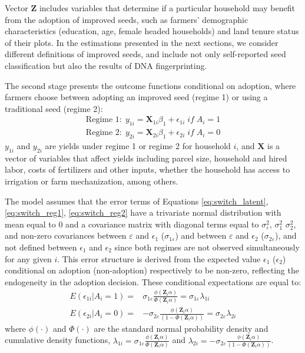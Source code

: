 \documentclass[11pt]{article}
\begin{document}
Vector $\bm{Z}$ includes variables that determine if a particular household may benefit from the adoption of improved seeds, such as farmers' demographic characteristics (education, age, female headed households) and land tenure status of their plots. In the estimations presented in the next sections, we consider different definitions of improved seeds, and include not only self-reported seed classification but also the results of DNA fingerprinting.  \par
The second stage presents the outcome functions conditional on adoption, where farmers choose between adopting an improved seed (regime 1) or using a traditional seed (regime 2):
\begin{align}
    \text{Regime 1}: \; y_{1i}=\bm{X}_{1i}\beta_1+ \epsilon_{1i} \; if \; A_i=1 \label{eq:switch_reg1}\\
     \text{Regime 2}: \; y_{2i}=\bm{X}_{2i}\beta_1+ \epsilon_{2i} \; if \; A_i=0 \label{eq:switch_reg2} 
\end{align}
$y_{1i}$ and $y_{2i}$ are yields under regime 1 or regime 2 for household $i$, and $\bm{X}$ is a vector of variables that affect yields including parcel size, household and hired labor, costs of fertilizers and other inputs, whether the household has access to irrigation or farm mechanization, among others.  \par
The model assumes that the error terms of Equations \ref{eq:switch_latent}, \ref{eq:switch_reg1}, \ref{eq:switch_reg2} have a trivariate normal distribution with mean equal to 0 and a covariance matrix with diagonal terms equal to $\sigma_{\varepsilon}^2$, $\sigma_1^2$ $\sigma_2^2$, and non-zero covariances between $\varepsilon$ and $\epsilon_1$ ($\sigma_{1\varepsilon}$) and between $\varepsilon$ and $\epsilon_2$ ($\sigma_{2\varepsilon}$), and not defined between $\epsilon_1$ and $\epsilon_2$ since both regimes are not observed simultaneously for any given $i$. This error structure is derived from the expected value $\epsilon_1$ ($\epsilon_2$) conditional on adoption  (non-adoption) respectively to be non-zero, reflecting the endogeneity in the adoption decision. These conditional expectations are equal to:
\begin{align*}
    E(\epsilon_{1i}|A_i=1)=&\sigma_{1\varepsilon}\frac{\phi(\bm{Z}_i\alpha)}{\Phi(\bm{Z}_i\alpha)}=\sigma_{1\varepsilon}\lambda_{1i} \\
    E(\epsilon_{2i}|A_i=0)=&-\sigma_{2\varepsilon}\frac{\phi(\bm{Z}_i\alpha)}{(1-\Phi(\bm{Z}_i\alpha))}=\sigma_{2\varepsilon}\lambda_{2i}
\end{align*}
%
where $\phi(\cdot)$ and $\Phi(\cdot)$ are the standard normal probability density and cumulative density functions, $\lambda_{1i}=\sigma_{1\varepsilon}\frac{\phi(\bm{Z}_i\alpha)}{\Phi(\bm{Z}_i\alpha)}$ and $\lambda_{2i}=-\sigma_{2\varepsilon}\frac{\phi(\bm{Z}_i\alpha)}{(1-\Phi(\bm{Z}_i\alpha))}$. \par
\end{document}
